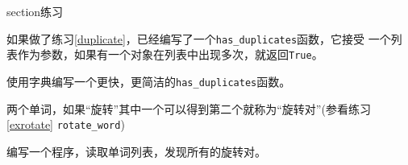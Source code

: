 section{练习}

\begin{ex}

如果做了练习\ref{duplicate}，已经编写了一个\verb"has_duplicates"函数，它接受
一个列表作为参数，如果有一个对象在列表中出现多次，就返回{\tt True}。

使用字典编写一个更快，更简洁的\verb"has_duplicates"函数。
\end{ex}



\begin{ex}
\label{exroptatepairs}


两个单词，如果“旋转”其中一个可以得到第二个就称为“旋转对”(参看练习\ref{exrotate} \verb"rotate_word")

编写一个程序，读取单词列表，发现所有的旋转对。
\end{ex}



